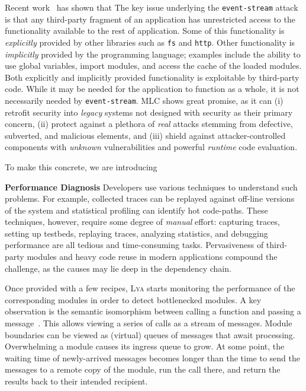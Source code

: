 \documentclass[letterpaper,twocolumn,10pt]{article}
\def\eg{{\em e.g.}, }
\newcommand{\heading}[1]{\vspace{2pt}\noindent\textbf{#1}\enspace}
\newcommand{\ttt}[1]{\texttt{#1}}
\newcommand{\sys}{{\scshape Lya}\xspace}
\begin{document}
Recent work~\cite{dld:08, sandcrust, tsampas2017towards, breakapp:ndss:2018} has shown that 
The key issue underlying the \ttt{event-stream} attack is that any third-party fragment of an application has unrestricted access to the functionality available to the rest of application. %
Some of this functionality is \emph{explicitly} provided by other libraries such as \ttt{fs} and \ttt{http}.
Other functionality is \emph{implicitly} provided by the programming language;
  examples include the ability to use global variables, import modules, and access the cache of the loaded modules.
Both explicitly and implicitly provided functionality is exploitable by third-party code.
While it may be needed for the application to function as a whole, it is not necessarily needed by \ttt{event-stream}.
MLC shows great promise, as it can
(i) retrofit security into \emph{legacy} systems not designed with security as their primary concern,
(ii) protect against a plethora of \emph{real} attacks stemming from defective, subverted, and malicious elements, and
(iii) shield against attacker-controlled components with \emph{unknown} vulnerabilities and powerful \emph{runtime} code evaluation. %

To make this concrete, we are introducing

\heading{Performance Diagnosis}
Developers use various techniques to understand such problems.
For example, collected traces can be replayed against off-line versions of the system and statistical profiling can identify hot code-paths.
These techniques, however, require some degree of \emph{manual} effort:
  capturing traces, setting up testbeds, replaying traces, analyzing statistics, and debugging performance are all tedious and time-consuming tasks.
Pervasiveness of third-party modules and heavy code reuse in modern applications compound the challenge, as the causes may lie deep in the dependency chain.

Once provided with a few recipes, \sys starts monitoring the performance of the corresponding modules in order to detect bottlenecked modules.
A key observation is the semantic isomorphism between calling a function and passing a message~\cite{scheme:98, duality:79}.
This allows viewing a series of calls as a stream of messages. %
Module boundaries can be viewed as (virtual) queues of messages that await processing.
Overwhelming a module causes its ingress queue to grow.
At some point, the waiting time of newly-arrived messages becomes longer than the time to send the messages to a remote copy of the module, run the call there, and return the results back to their intended recipient.
\end{document}
